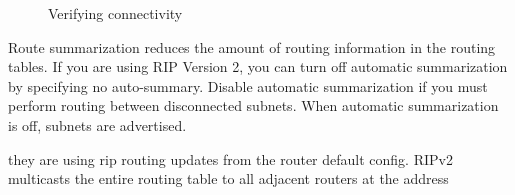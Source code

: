 \documentclass[../EngineeringJournal_CDavis.tex]{subfiles}
\begin{document}
\begin{figure}[!b]\centering
{}\par
{}\hfill 
{}\par
\caption{Verifying connectivity}
\label{VerifyRip8}
\end{figure}


\newpage


Route summarization reduces the amount of routing information in the routing tables.  If you are using RIP Version 2, you can turn off automatic summarization by specifying no auto-summary. Disable automatic summarization if you must perform routing between disconnected subnets. When automatic summarization is off, subnets are advertised.

they are using rip routing updates from the router default config. RIPv2 multicasts the entire routing table to all adjacent routers at the address 

\end{document}
